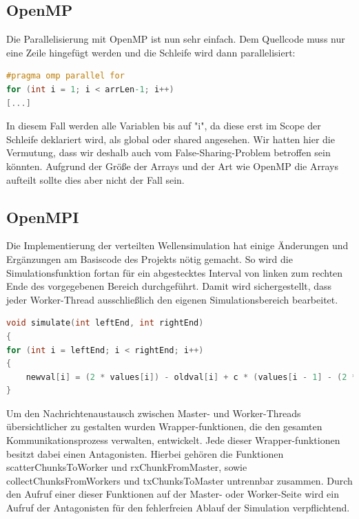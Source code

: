 \subsection{OpenMP}
Die Parallelisierung mit OpenMP ist nun sehr einfach. Dem Quellcode muss nur eine Zeile hingefügt werden und die Schleife wird dann parallelisiert:

\begin{lstlisting}[language=C]
#pragma omp parallel for
for (int i = 1; i < arrLen-1; i++)
[...]
\end{lstlisting}

In diesem Fall werden alle Variablen bis auf "i", da diese erst im Scope der Schleife deklariert wird, als global oder shared angesehen. Wir hatten hier die Vermutung, dass wir deshalb auch vom False-Sharing-Problem betroffen sein könnten. Aufgrund der Größe der Arrays und der Art wie OpenMP die Arrays aufteilt sollte dies aber nicht der Fall sein.

\subsection{OpenMPI}
Die Implementierung der verteilten Wellensimulation hat einige Änderungen und Ergänzungen am Basiscode des Projekts nötig gemacht. So wird die Simulationsfunktion fortan für ein abgestecktes Interval von linken zum rechten Ende des vorgegebenen Bereich durchgeführt. Damit wird sichergestellt, dass jeder Worker-Thread ausschließlich den eigenen Simulationsbereich bearbeitet.

\begin{lstlisting}[language=C]
void simulate(int leftEnd, int rightEnd)
{
for (int i = leftEnd; i < rightEnd; i++)
{
	newval[i] = (2 * values[i]) - oldval[i] + c * (values[i - 1] - (2 * values[i]) + values[i + 1]);
}
\end{lstlisting}

Um den Nachrichtenaustausch zwischen Master- und Worker-Threads übersichtlicher zu gestalten wurden Wrapper-funktionen, die den gesamten Kommunikationsprozess verwalten, entwickelt. Jede dieser Wrapper-funktionen besitzt dabei einen Antagonisten. Hierbei gehören die Funktionen scatterChunksToWorker und rxChunkFromMaster, sowie collectChunksFromWorkers und txChunksToMaster untrennbar zusammen. Durch den Aufruf einer dieser Funktionen auf der Master- oder Worker-Seite wird ein Aufruf der Antagonisten für den fehlerfreien Ablauf der Simulation verpflichtend.

